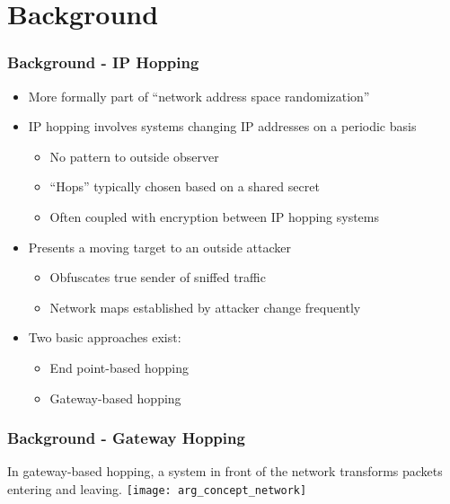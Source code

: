 \documentclass{beamer}
\begin{document}
\section{Background}
\begin{frame}
	\frametitle{Background - IP Hopping}
	\begin{itemize}
	\item More formally part of ``network address space randomization''
	\item IP hopping involves systems changing IP addresses on a periodic basis
		\begin{itemize}
		\item No pattern to outside observer
		\item ``Hops'' typically chosen based on a shared secret
		\item Often coupled with encryption between IP hopping systems
		\end{itemize}
	\item Presents a moving target to an outside attacker
		\begin{itemize}
		\item Obfuscates true sender of sniffed traffic
		\item Network maps established by attacker change frequently
		\end{itemize}
	\item Two basic approaches exist:
		\begin{itemize}
		\item End point-based hopping
		\item Gateway-based hopping
		\end{itemize}
	\end{itemize}
\end{frame}

\begin{frame}
	\frametitle{Background - Gateway Hopping}
	In gateway-based hopping, a system in front of the network transforms
	packets entering and leaving.
	\texttt{[image: arg\_concept\_network]}
\end{frame}
\end{document}
